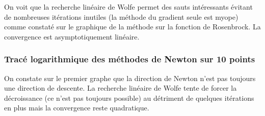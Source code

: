 \documentclass[a4paper,10pt]{article}
\begin{document}
\vspace{0.5cm}
On voit que la recherche linéaire de Wolfe permet des sauts intéressants évitant de nombreuses itérations inutiles (la méthode du gradient seule est myope) comme constaté sur le graphique de la méthode sur la fonction de Rosenbrock.
La convergence est asymptotiquement linéaire.

\vspace{0.5cm}
\subsubsection{Tracé logarithmique des méthodes de Newton sur 10 points}

\begin{figure}[h!]
	\centering
\end{figure}

\vspace{0.5cm}
On constate sur le premier graphe que la direction de Newton n'est pas toujours une direction de descente. 
La recherche linéaire de Wolfe tente de forcer la décroissance (ce n'est pas toujours possible) au détriment de quelques itérations en plus mais la convergence reste quadratique.
\end{document}
